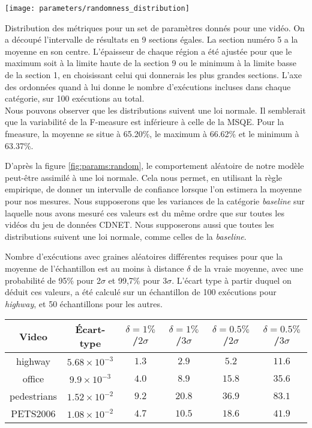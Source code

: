 	\begin{figureth}
		\texttt{[image: parameters/randomness\_distribution]}
		\caption[Effet de l'aléatoire sur les métriques]{Distribution des métriques pour un set de paramètres donnés pour une vidéo. On a découpé l'intervalle de résultats en 9 sections égales. La section numéro 5 a la moyenne en son centre. L'épaisseur de chaque région a été ajustée pour que le maximum soit à la limite haute de la section 9 ou le minimum à la limite basse de la section 1, en choisissant celui qui donnerais les plus grandes sections. L'axe des ordonnées quand à lui donne le nombre d'exécutions incluses dans chaque catégorie, sur 100 exécutions au total.\\
		
		Nous pouvons observer que les distributions suivent une loi normale. Il semblerait que la variabilité de la F-measure est inférieure à celle de la MSQE. Pour la fmeasure, la moyenne se situe à 65.20\%, le maximum à 66.62\% et le minimum à 63.37\%.}\label{fig:params:random}
	\end{figureth}

	D'après la figure \ref{fig:params:random}, le comportement aléatoire de notre modèle peut-être assimilé à une loi normale. Cela nous permet, en utilisant la règle empirique, de donner un intervalle de confiance lorsque l'on estimera la moyenne pour nos mesures. Nous supposerons que les variances de la catégorie \textit{baseline} sur laquelle nous avons mesuré ces valeurs est du même ordre que sur toutes les vidéos du jeu de données CDNET. Nous supposerons aussi que toutes les distributions suivent une loi normale, comme celles de la \textit{baseline}.

	\begin{tableth}
	\caption[Estimations statistiques du nombre de graines requises]{Nombre d'exécutions avec graines aléatoires différentes requises pour que la moyenne de l'échantillon est au moins à distance $\delta$ de la vraie moyenne, avec une probabilité de 95\% pour 2$\sigma$ et 99,7\% pour 3$\sigma$. L'écart type à partir duquel on déduit ces valeurs, a été calculé sur un échantillon de 100 exécutions pour \textit{highway}, et 50 échantillons pour les autres.}
	\label{tab:nb_seed_stats}
	\begin{tabular}{|c|c|cccc|}
		\hline
		Video	& Écart-type & $\delta=1\%$ /$2\sigma$ & $\delta=1\%$ /$3\sigma$ & $\delta=0.5\%$ /$2\sigma$ & $\delta=0.5\%$ /$3\sigma$\\
		\hline
		highway & $5.68 \times 10^{-3}$ & $1.3$ & $2.9$ & $5.2$ & $11.6$\\
		office & $9.9 \times 10^{-3}$ & $4.0$ & $8.9$ & $15.8$ & $35.6$\\
		pedestrians & $1.52 \times 10^{-2}$ & $9.2$ & $20.8$ & $36.9$ & $83.1$\\
		PETS2006 & $1.08 \times 10^{-2}$ & $4.7$ & $10.5$ & $18.6$ & $41.9$\\
		\hline
	\end{tabular}
	\end{tableth}


